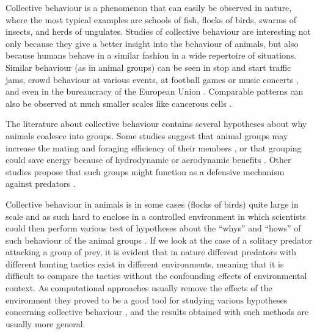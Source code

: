 Collective behaviour is a phenomenon that can easily be observed in nature, where the most typical examples are schools of fish, flocks of birds, swarms of insects, and herds of ungulates. Studies of collective behaviour are interesting not only because they give a better insight into the behaviour of animals, but also because humans behave in a similar fashion in a wide repertoire of situations. Similar behaviour (as in animal groups) can be seen in stop and start traffic jams, crowd behaviour at various events, \eg at football games or music concerts \cite{silverberg2013collective}, and even in the bureaucracy of the European Union \cite{sumpter2006principles}. Comparable patterns can also be observed at much smaller scales like cancerous cells \cite{deisboeck2009collective}.

The literature about collective behaviour contains several hypotheses about why animals coalesce into groups. Some studies suggest that animal groups may increase the mating and foraging efficiency of their members \cite{krebs1994behavioural}, or that grouping could save energy because of hydrodynamic or aerodynamic benefits \cite{bill1976drag,hemelrijk2014increased,lissaman1970formation,partridge1979evidence}. Other studies propose that such groups might function as a defensive mechanism against predators \cite{cresswell2011predicting,larsson2012why,demsar2014simulated,hart2005predator,krause2002living,lebarbajec2009organized,nishimura2000studying,pavlov2000patterns}.

Collective behaviour in animals is in some cases (\eg flocks of birds) quite large in scale and as such hard to enclose in a controlled environment in which scientists could then perform various test of hypotheses about the ``whys'' and ``hows'' of such behaviour of the animal groups \cite{lebarbajec2009organized}. If we look at the case of a solitary predator attacking a group of prey, it is evident that in nature different predators with different hunting tactics exist in different environments, meaning that it is difficult to compare the tactics without the confounding effects of environmental context. As computational approaches usually remove the effects of the environment they proved to be a good tool for studying various hypotheses concerning collective behaviour \cite{couzin2002collective,hildenbrandt2010selforganized,vicsek1995novel}, and the results obtained with such methods are usually more general.


